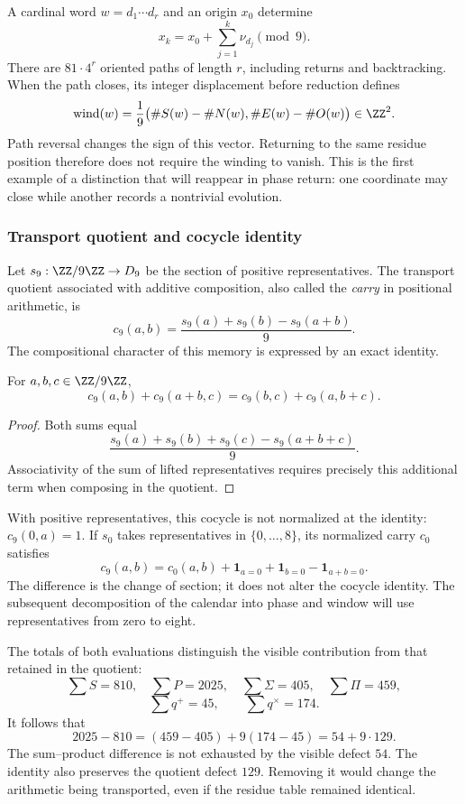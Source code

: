 A cardinal word \(w=d_1\cdots d_r\) and an origin \(x_0\) determine
\[
 x_k=x_0+\sum_{j=1}^k\nu_{d_j}\pmod9.
\]
There are \(81\cdot4^r\) oriented paths of length \(r\), including returns and backtracking. When the path closes, its integer displacement before reduction defines
\begin{equation}
 \operatorname{wind}(w)=\frac19
 \bigl(\#S(w)-\#N(w),\#E(w)-\#O(w)\bigr)\in\ZZ^2.
\end{equation}
Path reversal changes the sign of this vector. Returning to the same residue position therefore does not require the winding to vanish. This is the first example of a distinction that will reappear in phase return: one coordinate may close while another records a nontrivial evolution.

\subsubsection{Transport quotient and cocycle identity}

Let \(s_9:\ZZ/9\ZZ\to D_9\) be the section of positive representatives. The transport quotient associated with additive composition, also called the \emph{carry} in positional arithmetic, is
\[
 c_9(a,b)=\frac{s_9(a)+s_9(b)-s_9(a+b)}9.
\]
The compositional character of this memory is expressed by an exact identity.

\begin{lemma}
For \(a,b,c\in\ZZ/9\ZZ\),
\[
 c_9(a,b)+c_9(a+b,c)=c_9(b,c)+c_9(a,b+c).
\]
\end{lemma}
\begin{proof}
Both sums equal
\[
 \frac{s_9(a)+s_9(b)+s_9(c)-s_9(a+b+c)}9.
\]
Associativity of the sum of lifted representatives requires precisely this additional term when composing in the quotient.
\end{proof}

With positive representatives, this cocycle is not normalized at the identity: \(c_9(0,a)=1\). If \(s_0\) takes representatives in \(\{0,\ldots,8\}\), its normalized carry \(c_0\) satisfies
\[
 c_9(a,b)=c_0(a,b)+\mathbf1_{a=0}+\mathbf1_{b=0}-\mathbf1_{a+b=0}.
\]
The difference is the change of section; it does not alter the cocycle identity. The subsequent decomposition of the calendar into phase and window will use representatives from zero to eight.

The totals of both evaluations distinguish the visible contribution from that retained in the quotient:
\[
 \sum S=810,\quad\sum P=2025,\quad
 \sum\Sigma=405,\quad\sum\Pi=459,
\]
\[
 \sum q^+=45,\qquad\sum q^\times=174.
\]
It follows that
\begin{equation}
 2025-810=(459-405)+9(174-45)=54+9\cdot129.
 \label{eq:defecto-integrado}
\end{equation}
The sum--product difference is not exhausted by the visible defect \(54\). The identity also preserves the quotient defect \(129\). Removing it would change the arithmetic being transported, even if the residue table remained identical.

